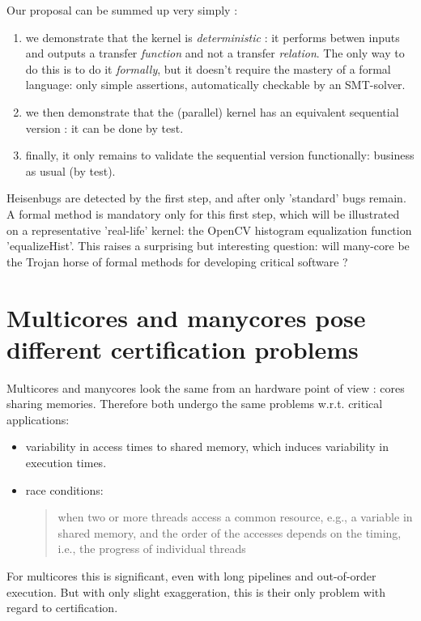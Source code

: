 \documentclass[a4paper,10pt]{article} %
\begin{document}
Our proposal can be summed up very simply :
\begin{enumerate}
\item we demonstrate that the kernel is \emph{deterministic} : it performs betwen inputs and outputs a transfer \emph{function} and not a transfer \emph{relation}. The only way to do this is to do it \emph{formally}, but it doesn't require the mastery of a formal language: only simple assertions, automatically checkable by an SMT-solver.
\item we then demonstrate that the (parallel) kernel has an equivalent sequential version : it can be done by test.
\item finally, it only remains to validate the sequential version functionally: business as usual (by test).
\end{enumerate}
Heisenbugs are detected by the first step, and after only 'standard' bugs remain.
A formal method is mandatory only for this first step, which will be illustrated on a representative 'real-life' kernel:  the OpenCV histogram equalization function 'equalizeHist'.
This raises a surprising but interesting question: will many-core be the Trojan horse of formal methods for developing critical software ?

\section{Multicores and manycores pose different certification problems}

Multicores and manycores look the same from an hardware point of view : cores sharing memories.
Therefore both undergo the same problems w.r.t. critical applications:
\begin{itemize}
\item
variability in access times to shared memory, which induces variability in execution times.
\item
race conditions: \cite{padua2011encyclopedia}
\begin{quotation}
when two or more threads access a common resource,
e.g., a variable in shared memory, and the order of the
accesses depends on the timing, i.e., the progress of
individual threads
\end{quotation}

\end{itemize}

For multicores this is significant, even with long pipelines and out-of-order execution. But with only slight exaggeration, this is their only problem with regard to certification.
\end{document}
